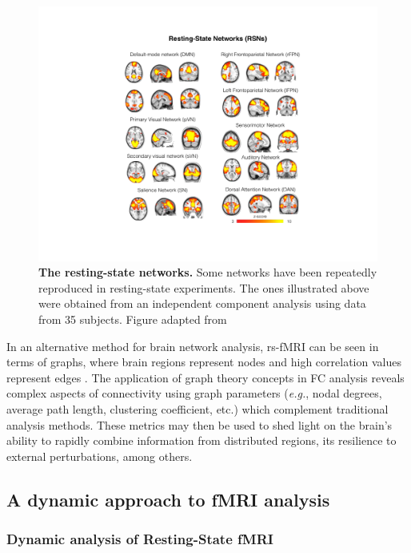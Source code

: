 \begin{figure}[h!]
\centering\includegraphics[width=0.9\linewidth]{images/Ch2/Ch2_RSN.pdf}
\caption{\textbf{The resting-state networks.} Some networks have been repeatedly reproduced in resting-state experiments. The ones illustrated above were obtained from an independent component analysis using data from 35 subjects. Figure adapted from \citet{Akbar2016}  } \label{fig:RSN}
\end{figure}





In an alternative method for brain network analysis, rs-fMRI can be seen in terms of graphs, where brain regions represent nodes and high correlation values represent edges \citep{Rubinov2010, Farahani2019}. The application of graph theory concepts in FC analysis reveals complex aspects of connectivity using graph parameters (\textit{e.g.}, nodal degrees, average path length, clustering coefficient, etc.) which complement traditional analysis methods. These metrics may then be used to shed light on the brain's ability to rapidly combine information from distributed regions, its resilience to external perturbations, among others.

\subsection{A dynamic approach to fMRI analysis}

\subsubsection{Dynamic analysis of Resting-State fMRI}


